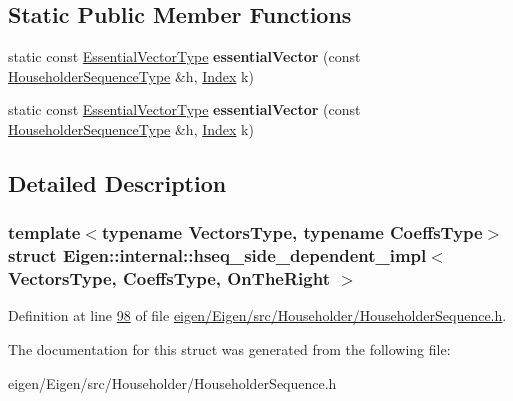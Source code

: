 \subsection*{Static Public Member Functions}
\begin{DoxyCompactItemize}
\item 
\mbox{\label{struct_eigen_1_1internal_1_1hseq__side__dependent__impl_3_01_vectors_type_00_01_coeffs_type_00_01_on_the_right_01_4_a464ddba84e35f766852036591374c8ec}} 
static const \hyperlink{group___core___module_class_eigen_1_1_transpose}{Essential\+Vector\+Type} {\bfseries essential\+Vector} (const \hyperlink{group___householder___module_class_eigen_1_1_householder_sequence}{Householder\+Sequence\+Type} \&h, \hyperlink{namespace_eigen_a62e77e0933482dafde8fe197d9a2cfde}{Index} k)
\item 
\mbox{\label{struct_eigen_1_1internal_1_1hseq__side__dependent__impl_3_01_vectors_type_00_01_coeffs_type_00_01_on_the_right_01_4_a464ddba84e35f766852036591374c8ec}} 
static const \hyperlink{group___core___module_class_eigen_1_1_transpose}{Essential\+Vector\+Type} {\bfseries essential\+Vector} (const \hyperlink{group___householder___module_class_eigen_1_1_householder_sequence}{Householder\+Sequence\+Type} \&h, \hyperlink{namespace_eigen_a62e77e0933482dafde8fe197d9a2cfde}{Index} k)
\end{DoxyCompactItemize}


\subsection{Detailed Description}
\subsubsection*{template$<$typename Vectors\+Type, typename Coeffs\+Type$>$\newline
struct Eigen\+::internal\+::hseq\+\_\+side\+\_\+dependent\+\_\+impl$<$ Vectors\+Type, Coeffs\+Type, On\+The\+Right $>$}



Definition at line \hyperlink{eigen_2_eigen_2src_2_householder_2_householder_sequence_8h_source_l00098}{98} of file \hyperlink{eigen_2_eigen_2src_2_householder_2_householder_sequence_8h_source}{eigen/\+Eigen/src/\+Householder/\+Householder\+Sequence.\+h}.



The documentation for this struct was generated from the following file\+:\begin{DoxyCompactItemize}
\item 
eigen/\+Eigen/src/\+Householder/\+Householder\+Sequence.\+h\end{DoxyCompactItemize}
